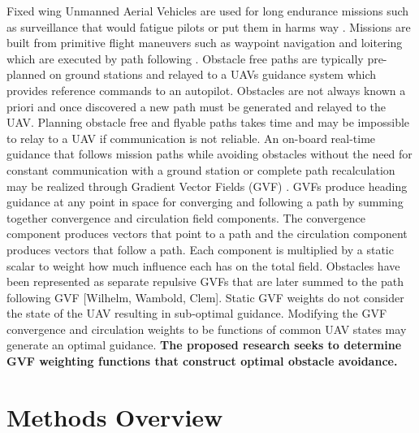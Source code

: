 \documentclass[numbered,pdftex]{ohio-etd}
\begin{document}
 Fixed wing Unmanned Aerial Vehicles are used for long endurance missions such as surveillance that would fatigue pilots or  put them in harms way \cite{bone_uavs_2003}.  Missions are built from primitive flight maneuvers such as waypoint navigation and loitering which are executed by path following \cite{sujit_unmanned_2014}. Obstacle free paths are typically pre-planned on ground stations and relayed to a UAVs guidance system which provides reference commands to an autopilot.  Obstacles are not always known a priori and once discovered a new path must be generated and relayed to the UAV.  Planning obstacle free and flyable paths takes time and may be impossible to relay to a UAV if communication is not reliable.  An on-board real-time guidance that follows mission paths while avoiding obstacles without the need for constant communication with a ground station or complete path recalculation may be realized through Gradient Vector Fields (GVF) \cite{goncalves_artificial_2009}. GVFs produce heading guidance at any point in space for converging and following a path by summing together convergence and circulation field components. The convergence component produces vectors that point to a path and the circulation component produces vectors that follow a path. Each component is multiplied by a static scalar to weight how much influence each has on the total field. Obstacles have been represented as separate repulsive GVFs that are later summed to the path following GVF [Wilhelm, Wambold, Clem]. Static GVF weights do not consider the state of the UAV resulting in sub-optimal guidance. Modifying the GVF convergence and circulation weights to be functions of common UAV states may generate an optimal guidance. \textbf{The proposed research seeks to determine GVF weighting functions that construct optimal obstacle avoidance.}

\section{Methods Overview}
\end{document}
